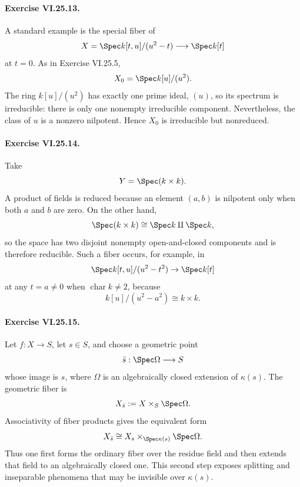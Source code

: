 \paragraph{Exercise VI.25.13.}
\begin{solution}
A standard example is the special fiber of
\[
X=\Spec k[t,u]/(u^2-t)\longrightarrow\Spec k[t]
\]
at \(t=0\).  As in Exercise VI.25.5,
\[
X_0=\Spec k[u]/(u^2).
\]
The ring \(k[u]/(u^2)\) has exactly one prime ideal, \((u)\), so its spectrum is irreducible: there is only one nonempty irreducible component.  Nevertheless, the class of \(u\) is a nonzero nilpotent.  Hence \(X_0\) is irreducible but nonreduced.
\end{solution}

\paragraph{Exercise VI.25.14.}
\begin{solution}
Take
\[
Y=\Spec(k\times k).
\]
A product of fields is reduced because an element \((a,b)\) is nilpotent only when both \(a\) and \(b\) are zero.  On the other hand,
\[
\Spec(k\times k)\cong\Spec k\amalg\Spec k,
\]
so the space has two disjoint nonempty open-and-closed components and is therefore reducible.  Such a fiber occurs, for example, in
\[
\Spec k[t,u]/(u^2-t^2)\to\Spec k[t]
\]
at any \(t=a\ne0\) when \(\operatorname{char}k\ne2\), because
\[
k[u]/(u^2-a^2)\cong k\times k.
\]
\end{solution}

\paragraph{Exercise VI.25.15.}
\begin{solution}
Let \(f:X\to S\), let \(s\in S\), and choose a geometric point
\[
\bar s:\Spec\Omega\longrightarrow S
\]
whose image is \(s\), where \(\Omega\) is an algebraically closed extension of \(\kappa(s)\).  The geometric fiber is
\[
X_{\bar s}:=X\times_S\Spec\Omega.
\]
Associativity of fiber products gives the equivalent form
\[
X_{\bar s}
\cong
X_s\times_{\Spec\kappa(s)}\Spec\Omega.
\]
Thus one first forms the ordinary fiber over the residue field and then extends that field to an algebraically closed one.  This second step exposes splitting and inseparable phenomena that may be invisible over \(\kappa(s)\).
\end{solution}

